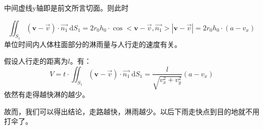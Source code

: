 \documentclass[UTF8]{ctexart}
\newcommand{\df}{\mathrm{~d}}
\begin{document}
中间虚线y轴即是前文所言切面。则此时

$$
\iint_{S_1}(\mathbf{v}-\vec{v}) \cdot \vec{n_1} \df S_1 = 2r_0h_0 \cdot \cos<\mathbf{v}-\vec{v},\vec{n_1}> |\mathbf{v}-\vec{v}| = 2r_0h_0 \cdot (a-v_x)
$$
单位时间内人体柱面部分的淋雨量与人行走的速度有关。

假设人行走的距离为$l$。有：
$$
V = t \cdot \iint_{S_1}(\mathbf{v}-\vec{v}) \cdot \vec{n_1} \df S_1 = \frac{l}{\sqrt{v_x^2+v_y^2}}(a-v_x)
$$
依然有走得越快淋的越少。

故而，我们可以得出结论，走路越快，淋雨越少。以后下雨走快点到目的地就不用打伞了。
\end{document}
